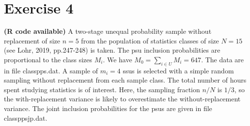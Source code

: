 \documentclass[12pt]{article}
\begin{document}
\section*{Exercise 4}
\textbf{\color{ForestGreen}(R code available)} A two-stage unequal probability sample without replacement of size $n=5$ from the population of statistics classes of size $N=15$ (see Lohr, 2019, pp.247-248) is taken. The psu inclusion probabilities
are proportional to the class sizes $M_i$. We have $M_0=\sum_{i \in U}M_i=647$. The data are in file classpps.dat. A sample of $m_i=4$ ssus is selected with a simple random sampling without replacement from each sample class. The total number of hours spent studying statistics is of interest. Here,
the sampling fraction $n/N$ is $1/3$, so the with-replacement variance is likely to
overestimate the without-replacement variance. The joint inclusion probabilities for
the psus are given in file classppsjp.dat.
\end{document}
